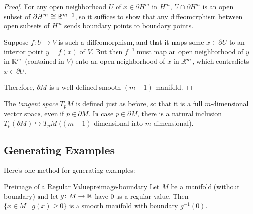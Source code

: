 \begin{proof}
    For any open neighborhood $U$ of $x \in \partial H^m$ in $H^m$, $U \cap \partial H^m$ is an open subset of $\partial H^m \cong \mathbb{R}^{m-1}$, so it suffices to show that any diffeomorphism between open subsets of $H^m$ sends boundary points to boundary points.

    Suppose $f \colon U \to V$ is such a diffeomorphism, and that it maps some $x \in \partial U$ to an interior point $y = f(x)$ of $V$. But then $f^{-1}$ must map an open neighborhood of $y$ in $\mathbb{R}^m$ (contained in $V$) onto an open neighborhood of $x$ in $\mathbb{R}^m$, which contradicts $x \in \partial U$.

    Therefore, $\partial M$ is a well-defined smooth $(m-1)$-manifold.
\end{proof}

The \emph{tangent space} $T_p M$ is defined just as before, so that it is a full $m$-dimensional vector space, even if $p \in \partial M$. In case $p \in \partial M$, there is a natural inclusion $T_p(\partial M) \hookrightarrow T_p M$ ($(m-1)$-dimensional into $m$-dimensional).

\begin{center}
\end{center}

\subsection{Generating Examples}

Here's one method for generating examples:

\begin{lemma}{Preimage of a Regular Value}{preimage-boundary}
    Let $M$ be a manifold (without boundary) and let $g \colon M \to \mathbb{R}$ have $0$ as a regular value. Then $\{x \in M \mid g(x) \geq 0\}$ is a smooth manifold with boundary $g^{-1}(0)$.
\end{lemma}

